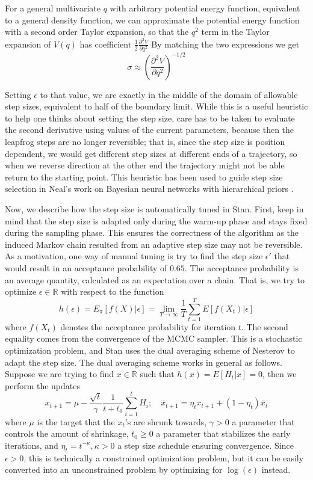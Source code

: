 \documentclass[12pt]{report}
\begin{document}
For a general multivariate $q$ with arbitrary potential energy function, equivalent to a general density function, we can approximate the potential energy function with a second order Taylor expansion, so that the $q^2$ term in the Taylor expansion of $V(q)$ has coefficient $\frac{1}{2} \frac{\partial^2 V}{\partial q^2}$  
By matching the two expressions we get 
\[ \sigma \approx \left( \frac{\partial^2 V}{\partial q^2}\right)^{-1/2} \]

Setting $\epsilon$ to that value, we are exactly in the middle of the domain of allowable step sizes, equivalent to half of the boundary limit. While this is a useful heuristic to help one thinks about setting the step size, 
care has to be taken to evaluate the second derivative using values of the current parameters, because then the leapfrog steps are no longer reversible; that is, since the step size is position dependent, we would get different step sizes at different ends of a trajectory, so when we reverse direction at the other end the trajectory might not be able return to the starting point. This heuristic has been used to guide step size selection in Neal's work on Bayesian neural networks with hierarchical priors \cite{neal2012bayesian}.

Now, we describe how the step size is automatically tuned in Stan. First, keep
in mind that the step size is adapted only during the warm-up phase and stays
fixed during the sampling phase. This ensures the correctness of the algorithm
as the induced Markov chain resulted from an adaptive step size may not be
reversible. As a motivation, one way of manual tuning is try to find the step size
$\epsilon'$ that would result in an acceptance probability of $0.65$. The
acceptance probability is an average quantity, calculated as an expectation
over a chain. That is, we try to optimize $\epsilon \in \mathbb{R}$ with respect
to the function 
\[ h(\epsilon) = E_\pi[f(X)|\epsilon]  = \lim_{T \rightarrow \infty} \frac{1}{T}
\sum_{t=1}^T E[f(X_t)|\epsilon] \]
where $f(X_t)$ denotes the acceptance probability for iteration $t$. The
second equality comes from the convergence of the MCMC sampler. This is a
stochastic optimization problem, and Stan uses the dual averaging scheme of
Nesterov to adapt the step size. The dual averaging scheme works in general as
follows. Suppose we are trying to find $x\in \mathbb{R}$ such that $h(x) =
E[H_t|x] = 0$, then we perform the updates 
\[x_{t+1}  = \mu - \frac{\sqrt{t}}{\gamma} \frac{1}{t+t_0} \sum_{i=1}^tH_i; \quad
\bar{x}_{t+1} = \eta_t x_{t+1} + (1-\eta_t) \bar{x}_t \]
where $\mu$ is the target that the $x_t$'s are shrunk towards, $\gamma > 0$ a
parameter that controls the amount of shrinkage, $t_0 \ge 0$ a parameter that
stabilizes the early iterations, and $\eta_t = t^{-\kappa},\kappa>0$  a
step size schedule ensuring convergence. Since $\epsilon>0$, this is technically
a constrained optimization problem, but it can be easily converted into an
unconstrained problem by optimizing for $\log(\epsilon)$ instead. 
\end{document}
